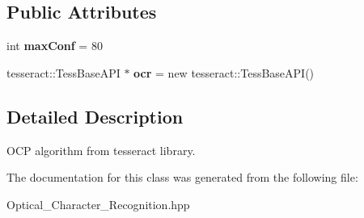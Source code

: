 \subsection*{Public Attributes}
\begin{DoxyCompactItemize}
\item 
\mbox{\label{class_optical___character___recognition_aa23b2e408dcd91e50176fb71ae38fc96}} 
int {\bfseries max\+Conf} = 80
\item 
\mbox{\label{class_optical___character___recognition_ad3fdb2f00dd03892c0e25ace9795ed42}} 
tesseract\+::\+Tess\+Base\+A\+PI $\ast$ {\bfseries ocr} = new tesseract\+::\+Tess\+Base\+A\+PI()
\end{DoxyCompactItemize}


\subsection{Detailed Description}
O\+CP algorithm from tesseract library. 

The documentation for this class was generated from the following file\+:\begin{DoxyCompactItemize}
\item 
Optical\+\_\+\+Character\+\_\+\+Recognition.\+hpp\end{DoxyCompactItemize}
